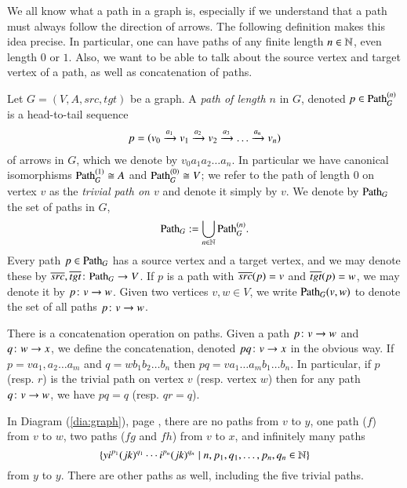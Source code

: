 We all know what a path in a graph is, especially if we understand that a path must always follow the direction of arrows. The following definition makes this idea precise. In particular, one can have paths of any finite length $n\in{\mathbb N}$, even length $0$ or $1$. Also, we want to be able to talk about the source vertex and target vertex of a path, as well as concatenation of paths.

\begin{definition}\label{def:paths in graph}

Let $G=(V,A,src,tgt)$ be a graph. A {\em path of length $n$} in $G$, denoted $p\in\Path_G^{(n)}$ is a head-to-tail sequence \begin{align}\label{dia:path}p=(v_0\xrightarrow{a_1}v_1\xrightarrow{a_2}v_2\xrightarrow{a_3}\ldots\xrightarrow{a_n}v_n)\end{align} of arrows in $G$, which we denote by $v_0 a_1 a_2 \ldots a_n$. In particular we have canonical isomorphisms $\Path_G^{(1)}\iso A$ and $\Path_G^{(0)}\iso V$; we refer to the path of length 0 on vertex $v$ as the {\em trivial path on $v$} and denote it simply by $v$. We denote by $\Path_G$ the set of paths in $G$, $$\Path_G:=\bigcup_{n\in\NN}\Path_G^{(n)}.$$ Every path $p\in\Path_G$ has a source vertex and a target vertex, and we may denote these by $\ol{src},\ol{tgt}\taking\Path_G\to V$. If $p$ is a path with $\overline{src}(p)=v$ and $\overline{tgt}(p)=w$, we may denote it by $p\colon v\rightarrow w$. Given two vertices $v,w\in V$, we write $\Path_G(v,w)$ to denote the set of all paths $p\colon v\rightarrow w$.

There is a concatenation operation on paths. Given a path $p\colon v\rightarrow w$ and $q\colon w\rightarrow x$, we define the concatenation, denoted $p q\colon v\rightarrow x$ in the obvious way. If $p=va_1,a_2\ldots a_m$ and $q= wb_1b_2\ldots b_n$ then $pq=va_1\ldots a_mb_1\ldots b_n.$ In particular, if $p$ (resp. $r$) is the trivial path on vertex $v$ (resp. vertex $w$) then for any path $q\colon v\rightarrow w$, we have $pq=q$ (resp. $qr=q$). 

\end{definition}

\begin{example}

In Diagram (\ref{dia:graph}), page \pageref{dia:graph}, there are no paths from $v$ to $y$, one path ($f$) from $v$ to $w$, two paths ($fg$ and $fh$) from $v$ to $x$, and infinitely many paths $$\{y i^{p_1}(jk)^{q_1}\cdots i^{p_n}(jk)^{q_n}\;|\;n,p_1,q_1,\ldots,p_n,q_n\in{\mathbb N}\}$$ from $y$ to $y$. There are other paths as well, including the five trivial paths.

\end{example}

